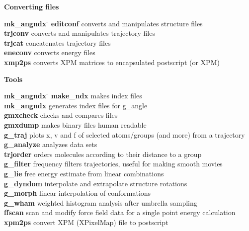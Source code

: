 \begin{description}
\item {\large\bf Converting files}
\vspace{-2ex}\begin{tabbing}
{\bf mk\_angndx} \= \kill
{\bf editconf} \> converts and manipulates structure files \\
{\bf trjconv} \> converts and manipulates trajectory files \\
{\bf trjcat} \> concatenates trajectory files \\
{\bf eneconv} \> converts energy files \\
{\bf xmp2ps} \> converts XPM matrices to encapsulated postscript (or XPM) \\
\end{tabbing}\vspace{-2ex}

\item {\large\bf Tools}
\vspace{-2ex}\begin{tabbing}
{\bf mk\_angndx} \= \kill
{\bf make\_ndx} \> makes index files \\
{\bf mk\_angndx} \> generates index files for g\_angle \\
{\bf gmxcheck} \> checks and compares files \\
{\bf gmxdump} \> makes binary files human readable \\
{\bf g\_traj} \> plots x, v and f of selected atoms/groups (and more) from a trajectory \\
{\bf g\_analyze} \> analyzes data sets \\
{\bf trjorder} \> orders molecules according to their distance to a group \\
{\bf g\_filter} \> frequency filters trajectories, useful for making smooth movies \\
{\bf g\_lie} \> free energy estimate from linear combinations \\
{\bf g\_dyndom} \> interpolate and extrapolate structure rotations \\
{\bf g\_morph} \> linear interpolation of conformations  \\
{\bf g\_wham} \> weighted histogram analysis after umbrella sampling \\
{\bf ffscan} \> scan and modify force field data for a single point energy calculation \\
{\bf xpm2ps} \> convert XPM (XPixelMap) file to postscript \\
\end{tabbing}\vspace{-2ex}


\end{description}
